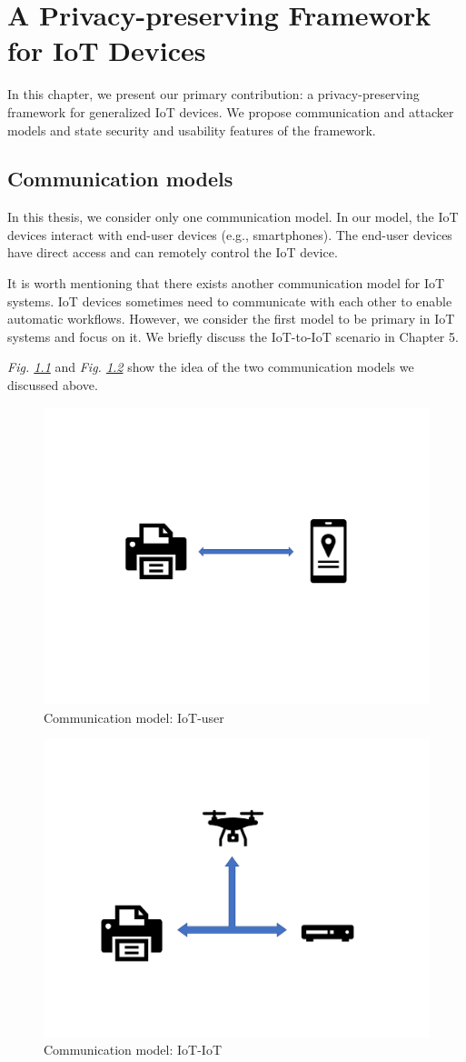 \chapter{A Privacy-preserving Framework for IoT Devices}

In this chapter, we present our primary contribution: a privacy-preserving framework for generalized IoT devices. We propose communication and attacker models and state security and usability features of the framework.

\section{Communication models}

In this thesis, we consider only one communication model. In our model, the IoT devices interact with end-user devices (e.g., smartphones). The end-user devices have direct access and can remotely control the IoT device.

It is worth mentioning that there exists another communication model for IoT systems. IoT devices sometimes need to communicate with each other to enable automatic workflows. However, we consider the first model to be primary in IoT systems and focus on it. We briefly discuss the IoT-to-IoT scenario in Chapter 5. 

\textit{Fig. \ref{fig:cm1}} and \textit{Fig. \ref{fig:cm2}} show the idea of the two communication models we discussed above. 



\begin{figure}
	\centering
		\includegraphics[width=0.6\linewidth]{comm_model_1.pdf}
		\caption{Communication model: IoT-user}
		\label{fig:cm1}
\end{figure}
\begin{figure}
	\centering
		\includegraphics[width=0.6\linewidth]{comm_model_2.pdf}
		\caption{Communication model: IoT-IoT}
		\label{fig:cm2}
\end{figure}

